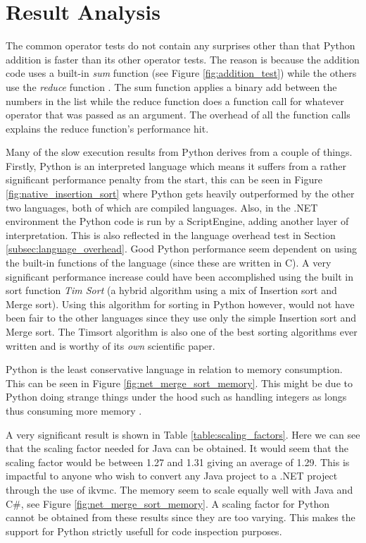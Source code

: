 \section{Result Analysis}

The common operator tests do not contain any surprises other than that Python addition is faster than its other operator tests. The reason is because the addition code uses a built-in \textit{sum} function \cite{PythonSum} (see Figure \ref{fig:addition_test}) while the others use the \textit{reduce} function \cite{PythonReduce}. The sum function applies a binary add between the numbers in the list while the reduce function does a function call for whatever operator that was passed as an argument. The overhead of all the function calls explains the reduce function's performance hit.

Many of the slow execution results from Python derives from a couple of things. Firstly, Python is an interpreted language which means it suffers from a rather significant performance penalty from the start, this can be seen in Figure \ref{fig:native_insertion_sort} where Python gets heavily outperformed by the other two languages, both of which are compiled languages. Also, in the .NET environment the Python code is run by a ScriptEngine, adding another layer of interpretation. This is also reflected in the language overhead test in Section \ref{subsec:language_overhead}. Good Python performance seem dependent on using the built-in functions of the language (since these are written in C). A very significant performance increase could have been accomplished using the built in sort function \textit{Tim Sort} \cite{PythonSort} (a hybrid algorithm using a mix of Insertion sort and Merge sort). Using this algorithm for sorting in Python however, would not have been fair to the other languages since they use only the simple Insertion sort and Merge sort. The Timsort algorithm is also one of the best sorting algorithms ever written and is worthy of its \textit{own} scientific paper.

Python is the least conservative language in relation to memory consumption. This can be seen in Figure \ref{fig:net_merge_sort_memory}. This might be due to Python doing strange things under the hood such as handling integers as longs thus consuming more memory \cite{PythonInteger}.

A very significant result is shown in Table \ref{table:scaling_factors}. Here we can see that the scaling factor needed for Java can be obtained. It would seem that the scaling factor would be between 1.27 and 1.31 giving an average of 1.29. This is impactful to anyone who wish to convert any Java project to a .NET project through the use of ikvmc. The memory seem to scale equally well with Java and C\#, see Figure \ref{fig:net_merge_sort_memory}. A scaling factor for Python cannot be obtained from these results since they are too varying. This makes the support for Python strictly usefull for code inspection purposes.
